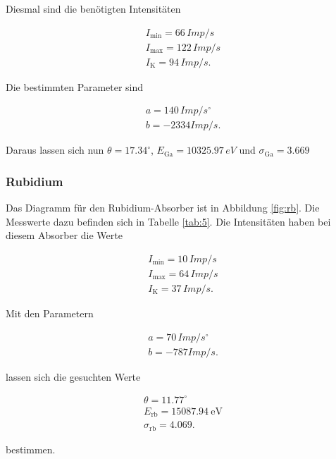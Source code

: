 Diesmal sind die benötigten Intensitäten

\begin{align*}
    I_\text{min} = 66 \, Imp/s \\
    I_\text{max} = 122 \, Imp/s \\
    I_\text{K} = 94 \, Imp/s.
\end{align*}

Die bestimmten Parameter sind

\begin{align*}
    a = 140 \, Imp/s^\circ \\
    b = -2334 Imp/s.
\end{align*}

Daraus lassen sich nun $\theta = 17.34  ^\circ$, $E_\text{Ga} = 10325.97 \, eV$ und $\sigma_\text{Ga} = 3.669$

\subsubsection{Rubidium}

Das Diagramm für den Rubidium-Absorber ist in Abbildung \ref{fig:rb}. Die Messwerte dazu befinden sich in Tabelle \ref{tab:5}. Die Intensitäten haben bei diesem Absorber die Werte  

\begin{align*}
    I_\text{min} = 10 \, Imp/s \\
    I_\text{max} = 64 \, Imp/s \\
    I_\text{K} = 37 \, Imp/s.
\end{align*}

Mit den Parametern

\begin{align*}
    a = 70 \, Imp/s^\circ \\
    b = -787 Imp/s.
\end{align*}

lassen sich die gesuchten Werte 

\begin{align*}
    \theta = 11.77  ^\circ \\
    E_\text{rb} = \SI{15087.94}{\electronvolt}\\
    \sigma_\text{rb} = 4.069.
\end{align*}

bestimmen.

